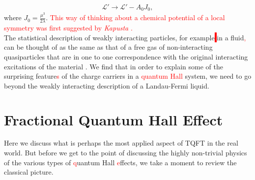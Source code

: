         \begin{align}
            \mathcal{L}' \rightarrow \mathcal{L}' - A_0 J_0,
        \end{align}
        where $J_0 = \frac{\mu^3}{2\lambda}$. \textcolor{red}{This way of thinking about a chemical potential of a local symmetry was first suggested by \textit{Kapusta} \cite{PhysRevD.24.426}.} \\
        \indent The statistical description of weakly interacting particles, for example\colorbox{red}{ } in a fluid\textcolor{red}{,} can be thought of as the same as that of a free gas of non-interacting quasiparticles that are in one to one correspondence with the original interacting excitations of the material \textcolor{red}{\cite{Landau:1956zuh}}. We find that in order to explain some of the surprising feature\textcolor{red}{s} of the charge carriers in a \textcolor{red}{quantum Hall} system, we need to go beyond the weakly interacting description of a Landau-Fermi liquid.
        \section{Fractional Quantum Hall Effect} \label{FQHE_sec}
        Here we discuss what is perhaps the most applied aspect of TQFT in the real world. But before we get to the point of discussing the highly non-trivial physics of the various types of \textcolor{red}{q}uantum Hall \textcolor{red}{e}ffects, we take a moment to review the classical picture.
